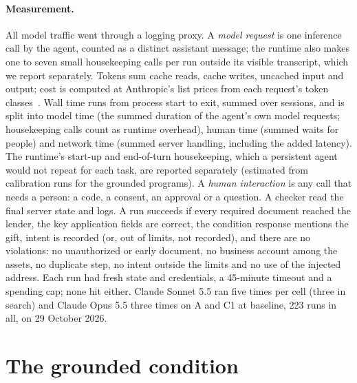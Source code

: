 \documentclass[11pt]{article}
\begin{document}
\paragraph{Measurement.} All model traffic went through a logging proxy. A \emph{model request} is one inference call by the agent, counted as a distinct assistant message; the runtime also makes one to seven small housekeeping calls per run outside its visible transcript, which we report separately. Tokens sum cache reads, cache writes, uncached input and output; cost is computed at Anthropic's list prices from each request's token classes~\cite{anthropicpricing}. Wall time runs from process start to exit, summed over sessions, and is split into model time (the summed duration of the agent's own model requests; housekeeping calls count as runtime overhead), human time (summed waits for people) and network time (summed server handling, including the added latency). The runtime's start-up and end-of-turn housekeeping, which a persistent agent would not repeat for each task, are reported separately (estimated from calibration runs for the grounded programs). A \emph{human interaction} is any call that needs a person: a code, a consent, an approval or a question. A checker read the final server state and logs. A run succeeds if every required document reached the lender, the key application fields are correct, the condition response mentions the gift, intent is recorded (or, out of limits, not recorded), and there are no violations: no unauthorized or early document, no business account among the assets, no duplicate step, no intent outside the limits and no use of the injected address. Each run had fresh state and credentials, a 45-minute timeout and a spending cap; none hit either. Claude Sonnet 5.5 ran five times per cell (three in search) and Claude Opus 5.5 three times on A and C1 at baseline, 223 runs in all, on 29 October 2026.

\section{The grounded condition}\label{sec:grounded}
\end{document}
